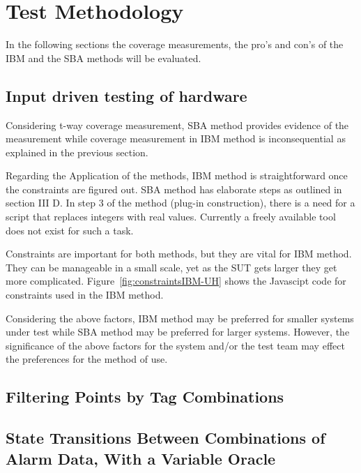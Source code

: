 \documentclass[conference]{IEEEtran}
\begin{document}
\section{Test Methodology}
	
	In the following sections the coverage measurements, the pro's and con's of the IBM and the SBA methods will be evaluated. 
		
	
	\subsection{Input driven testing of hardware}
	
	Considering t-way coverage measurement, SBA method provides evidence of the measurement while coverage measurement in IBM method is inconsequential as explained in the previous section. 
		
	Regarding the Application of the methods, IBM method is straightforward once the constraints are figured out. 
	SBA method has elaborate steps as outlined in section III D. 
	In step 3 of the method (plug-in construction), there is a need for a script that replaces integers with real values.
	Currently a freely available tool does not exist for such a task.
	
	Constraints are important for both methods, but they are vital for IBM method. 
	They can be manageable in a small scale, yet as the SUT gets larger they get more complicated. 
	Figure~\ref{fig:constraintsIBM-UH} shows the Javascipt code for constraints used in the IBM method.
	

	Considering the above factors, IBM method may be preferred for smaller systems under test while SBA method may be preferred for larger systems.
	However, the significance of the above factors for the system and/or the test team may effect the preferences for the method of use.

	\subsection{Filtering Points by Tag Combinations }

	\subsection{State Transitions Between Combinations of Alarm Data, With a Variable Oracle}
\end{document}
